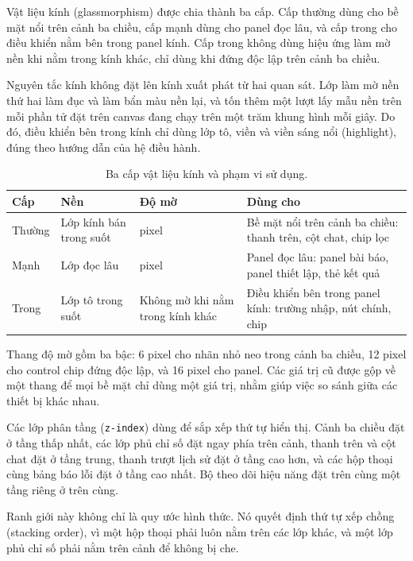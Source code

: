 Vật liệu kính (glassmorphism) được chia thành ba cấp. Cấp thường dùng cho bề mặt nổi trên cảnh ba chiều, cấp mạnh dùng cho panel đọc lâu, và cấp trong cho điều khiển nằm bên trong panel kính. Cấp trong không dùng hiệu ứng làm mờ nền khi nằm trong kính khác, chỉ dùng khi đứng độc lập trên cảnh ba chiều.

Nguyên tắc kính không đặt lên kính xuất phát từ hai quan sát. Lớp làm mờ nền thứ hai làm đục và làm bẩn màu nền lại, và tốn thêm một lượt lấy mẫu nền trên mỗi phần tử đặt trên canvas đang chạy trên một trăm khung hình mỗi giây. Do đó, điều khiển bên trong kính chỉ dùng lớp tô, viền và viền sáng nổi (highlight), đúng theo hướng dẫn của hệ điều hành.

\begin{table}[htbp]
    \centering
    \caption{Ba cấp vật liệu kính và phạm vi sử dụng.}
    \label{tab:ba-cap-vat-lieu-kinh}
    \small
    \begin{tabularx}{\textwidth}{@{}l>{\raggedright\arraybackslash}p{2.6cm}>{\raggedright\arraybackslash}p{3.2cm}>{\raggedright\arraybackslash}X@{}}
        \toprule
        \textbf{Cấp} & \textbf{Nền} & \textbf{Độ mờ} & \textbf{Dùng cho} \\
        \midrule
        Thường & Lớp kính bán trong suốt & 16 pixel & Bề mặt nổi trên cảnh ba chiều: thanh trên, cột chat, chip lọc \\
        Mạnh & Lớp đọc lâu & 16 pixel & Panel đọc lâu: panel bài báo, panel thiết lập, thẻ kết quả \\
        Trong & Lớp tô trong suốt & Không mờ khi nằm trong kính khác & Điều khiển bên trong panel kính: trường nhập, nút chính, chip \\
        \bottomrule
    \end{tabularx}
\end{table}

Thang độ mờ gồm ba bậc: 6 pixel cho nhãn nhỏ neo trong cảnh ba chiều, 12 pixel cho control chip đứng độc lập, và 16 pixel cho panel. Các giá trị cũ được gộp về một thang để mọi bề mặt chỉ dùng một giá trị, nhằm giúp việc so sánh giữa các thiết bị khác nhau.

Các lớp phân tầng (\texttt{z-index}) dùng để sắp xếp thứ tự hiển thị. Cảnh ba chiều đặt ở tầng thấp nhất, các lớp phủ chỉ số đặt ngay phía trên cảnh, thanh trên và cột chat đặt ở tầng trung, thanh trượt lịch sử đặt ở tầng cao hơn, và các hộp thoại cùng bảng báo lỗi đặt ở tầng cao nhất. Bộ theo dõi hiệu năng đặt trên cùng một tầng riêng ở trên cùng.

Ranh giới này không chỉ là quy ước hình thức. Nó quyết định thứ tự xếp chồng (stacking order), vì một hộp thoại phải luôn nằm trên các lớp khác, và một lớp phủ chỉ số phải nằm trên cảnh để không bị che.

